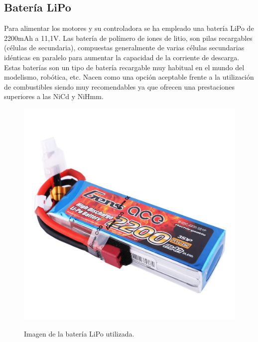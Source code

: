 \subsection{ Batería LiPo }

Para alimentar los motores y su controladora se ha empleado una batería LiPo de 2200mAh a 11,1V. Las batería de polímero de iones de litio, son pilas recargables (células de secundaria), compuestas generalmente 
de varias células secundarias idénticas en paralelo para aumentar la capacidad de la corriente de descarga. \\

Estas baterías son un tipo de batería recargable muy habitual en el mundo del modelismo, robótica, etc.  Nacen como una opción aceptable frente a la utilización
de combustibles siendo muy recomendables ya que ofrecen una prestaciones superiores a las NiCd y NiHmm.\\

\begin{figure}[H]
  \begin{center}
    \includegraphics[scale=0.2]{imagenes/robot/bateria.jpg}\\
    \caption{Imagen de la batería LiPo utilizada.}
  \end{center}
\end{figure}

